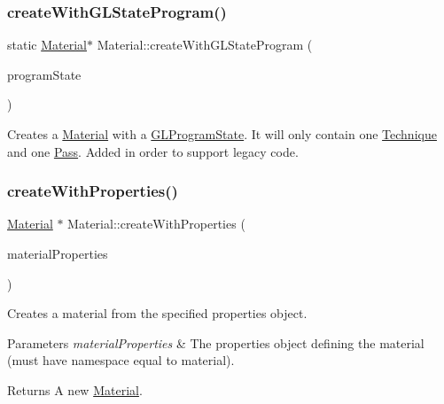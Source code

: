 \subsubsection{\texorpdfstring{create\+With\+G\+L\+State\+Program()}{createWithGLStateProgram()}\hspace{0.1cm}{\footnotesize\ttfamily [2/2]}}
{\footnotesize\ttfamily static \hyperlink{classMaterial}{Material}$\ast$ Material\+::create\+With\+G\+L\+State\+Program (\begin{DoxyParamCaption}\item[{\hyperlink{classGLProgramState}{G\+L\+Program\+State} $\ast$}]{program\+State }\end{DoxyParamCaption})\hspace{0.3cm}{\ttfamily [static]}}

Creates a \hyperlink{classMaterial}{Material} with a \hyperlink{classGLProgramState}{G\+L\+Program\+State}. It will only contain one \hyperlink{classTechnique}{Technique} and one \hyperlink{classPass}{Pass}. Added in order to support legacy code. \mbox{\label{classMaterial_aaeceb55f231edb94919198b18d9ec1ca}} 
\subsubsection{\texorpdfstring{create\+With\+Properties()}{createWithProperties()}\hspace{0.1cm}{\footnotesize\ttfamily [1/2]}}
{\footnotesize\ttfamily \hyperlink{classMaterial}{Material} $\ast$ Material\+::create\+With\+Properties (\begin{DoxyParamCaption}\item[{\hyperlink{classProperties}{Properties} $\ast$}]{material\+Properties }\end{DoxyParamCaption})\hspace{0.3cm}{\ttfamily [static]}}

Creates a material from the specified properties object.


\begin{DoxyParams}{Parameters}
{\em material\+Properties} & The properties object defining the material (must have namespace equal to \textquotesingle{}material\textquotesingle{}). \\
\hline
\end{DoxyParams}
\begin{DoxyReturn}{Returns}
A new \hyperlink{classMaterial}{Material}. 
\end{DoxyReturn}
\mbox{\label{classMaterial_acd4f5fcbc5b60661fb07ae21ef7930dc}} 
